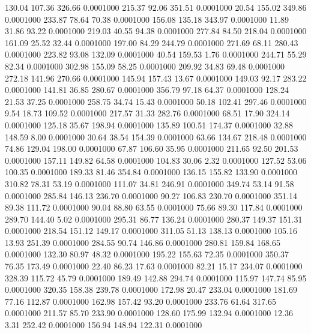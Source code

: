  130.04  107.36  326.66   0.0001000
 215.37   92.06  351.51   0.0001000
  20.54  155.02  349.86   0.0001000
 233.87   78.64   70.38   0.0001000
 156.08  135.18  343.97   0.0001000
  11.89   31.86   93.22   0.0001000
 219.03   40.55   94.38   0.0001000
 277.84   84.50  218.04   0.0001000
 161.09   25.52   32.44   0.0001000
 197.00   84.29  244.79   0.0001000
 271.69   68.11  280.43   0.0001000
 223.82   93.08  132.09   0.0001000
  40.54  159.53    1.76   0.0001000
 244.71   55.29   82.34   0.0001000
 302.98  155.09   58.25   0.0001000
 209.92   34.83   69.48   0.0001000
 272.18  141.96  270.66   0.0001000
 145.94  157.43   13.67   0.0001000
 149.03   92.17  283.22   0.0001000
 141.81   36.85  280.67   0.0001000
 356.79   97.18   64.37   0.0001000
 128.24   21.53   37.25   0.0001000
 258.75   34.74   15.43   0.0001000
  50.18  102.41  297.46   0.0001000
   9.54   18.73  109.52   0.0001000
 217.57   31.33  282.76   0.0001000
  68.51   17.90  324.14   0.0001000
 125.18   35.67  198.94   0.0001000
 135.89  100.51  174.37   0.0001000
  32.88  148.59    8.00   0.0001000
  30.64   38.54  154.39   0.0001000
  63.66  134.67  218.48   0.0001000
  74.86  129.04  198.00   0.0001000
  67.87  106.60   35.95   0.0001000
 211.65   92.50  201.53   0.0001000
 157.11  149.82   64.58   0.0001000
 104.83   30.06    2.32   0.0001000
 127.52   53.06  100.35   0.0001000
 189.33   81.46  354.84   0.0001000
 136.15  155.82  133.90   0.0001000
 310.82   78.31   53.19   0.0001000
 111.07   34.81  246.91   0.0001000
 349.74   53.14   91.58   0.0001000
 285.84  146.13  236.70   0.0001000
  90.27  106.83  230.70   0.0001000
 351.14   89.38  111.72   0.0001000
  90.04   88.80   63.55   0.0001000
  75.66   89.30  117.84   0.0001000
 289.70  144.40    5.02   0.0001000
 295.31   86.77  136.24   0.0001000
 280.37  149.37  151.31   0.0001000
 218.54  151.12  149.17   0.0001000
 311.05   51.13  138.13   0.0001000
 105.16   13.93  251.39   0.0001000
 284.55   90.74  146.86   0.0001000
 280.81  159.84  168.65   0.0001000
 132.30   80.97   48.32   0.0001000
 195.22  155.63   72.35   0.0001000
 350.37   76.35  173.49   0.0001000
  22.40   86.23   17.63   0.0001000
  82.21   15.17  234.07   0.0001000
 328.39  115.72   45.79   0.0001000
 189.49  142.88  294.74   0.0001000
 115.97  147.74   85.95   0.0001000
 320.35  158.38  239.78   0.0001000
 172.98   20.47  233.04   0.0001000
 181.69   77.16  112.87   0.0001000
 162.98  157.42   93.20   0.0001000
 233.76   61.64  317.65   0.0001000
 211.57   85.70  233.90   0.0001000
 128.60  175.99  132.94   0.0001000
  12.36    3.31  252.42   0.0001000
 156.94  148.94  122.31   0.0001000
